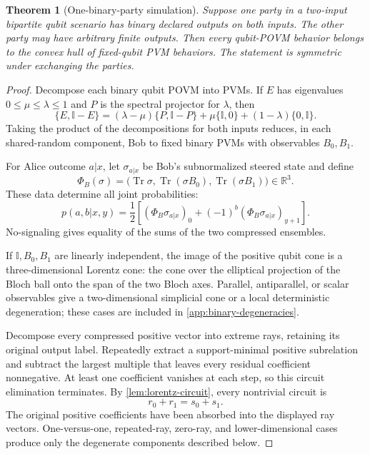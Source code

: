 \documentclass[11pt]{article}
\newtheorem{theorem}{Theorem}[section]
\theoremstyle{definition}
\newcommand{\Tr}{\operatorname{Tr}}
\newcommand{\id}{\mathbb I}
\newcommand{\R}{\mathbb R}
\begin{document}
\begin{theorem}[One-binary-party simulation]
\label{thm:binary-party}
Suppose one party in a two-input bipartite qubit scenario has binary declared
outputs on both inputs. The other party may have arbitrary finite outputs.
Then every qubit-POVM behavior belongs to the convex hull of fixed-qubit PVM
behaviors. The statement is symmetric under exchanging the parties.
\end{theorem}

\begin{proof}
Decompose each binary qubit POVM into PVMs. If \(E\) has eigenvalues
\(0\le\mu\le\lambda\le1\) and \(P\) is the spectral projector for \(\lambda\),
then
\[
\{E,\id-E\}=(\lambda-\mu)\{P,\id-P\}
+\mu\{\id,0\}+(1-\lambda)\{0,\id\}.
\]
Taking the product of the decompositions for both inputs reduces, in each
shared-random component, Bob to fixed binary PVMs with observables \(B_0,B_1\).

For Alice outcome \(a|x\), let \(\sigma_{a|x}\) be Bob's subnormalized steered
state and define
\[
\Phi_B(\sigma)=
\bigl(\Tr\sigma,\Tr(\sigma B_0),\Tr(\sigma B_1)\bigr)\in\R^3.
\]
These data determine all joint probabilities:
\[
p(a,b|x,y)=\frac12\left[
(\Phi_B\sigma_{a|x})_0+(-1)^b(\Phi_B\sigma_{a|x})_{y+1}
\right].
\]
No-signaling gives equality of the sums of the two compressed ensembles.

If \(\id,B_0,B_1\) are linearly independent, the image of the positive
qubit cone is a three-dimensional Lorentz cone: the cone over the elliptical
projection of the Bloch ball onto the span of the two Bloch axes. Parallel,
antiparallel, or scalar observables give a two-dimensional simplicial cone or
a local deterministic degeneration; these cases are included in
\cref{app:binary-degeneracies}.

Decompose every compressed positive vector into extreme rays, retaining its
original output label. Repeatedly extract a support-minimal positive
subrelation and subtract the largest multiple that leaves every residual
coefficient nonnegative. At least one coefficient vanishes at each step, so
this circuit elimination terminates. By \cref{lem:lorentz-circuit}, every
nontrivial circuit is
\[
r_0+r_1=s_0+s_1.
\]
The original positive coefficients have been absorbed into the displayed ray
vectors. One-versus-one, repeated-ray, zero-ray, and lower-dimensional cases
produce only the degenerate components described below.


\end{proof}
\end{document}
